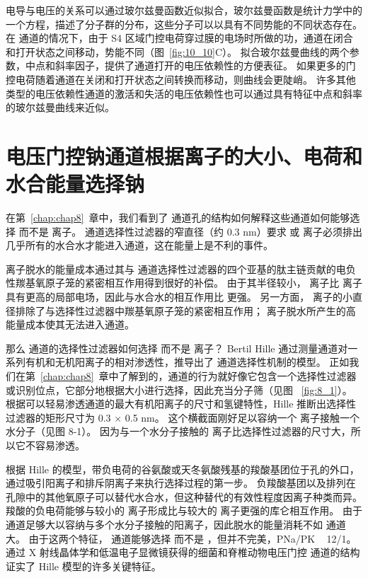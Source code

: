 电导与电压的关系可以通过玻尔兹曼函数近似拟合，玻尔兹曼函数是统计力学中的一个方程，描述了分子群的分布，这些分子可以以具有不同势能的不同状态存在。
在  通道的情况下，由于 S4 区域门控电荷穿过膜的电场时所做的功，通道在闭合和打开状态之间移动，势能不同（图~\ref{fig:10_10}C）。
拟合玻尔兹曼曲线的两个参数，中点和斜率因子，提供了通道打开的电压依赖性的方便表征。
如果更多的门控电荷随着通道在关闭和打开状态之间转换而移动，则曲线会更陡峭。
许多其他类型的电压依赖性通道的激活和失活的电压依赖性也可以通过具有特征中点和斜率的玻尔兹曼曲线来近似。


\section{电压门控钠通道根据离子的大小、电荷和水合能量选择钠}

在第~\ref{chap:chap8}~章中，我们看到了  通道孔的结构如何解释这些通道如何能够选择  而不是  离子。
 通道选择性过滤器的窄直径（约 0.3 nm）要求  或  离子必须排出几乎所有的水合水才能进入通道，这在能量上是不利的事件。


 离子脱水的能量成本通过其与  通道选择性过滤器的四个亚基的肽主链贡献的电负性羰基氧原子笼的紧密相互作用得到很好的补偿。
由于其半径较小， 离子比  离子具有更高的局部电场，因此与水合水的相互作用比  更强。
另一方面， 离子的小直径排除了与选择性过滤器中羰基氧原子笼的紧密相互作用；
 离子脱水所产生的高能量成本使其无法进入通道。


那么  通道的选择性过滤器如何选择  而不是  离子？
Bertil Hille 通过测量通道对一系列有机和无机阳离子的相对渗透性，推导出了  通道选择性机制的模型。
正如我们在第~\ref{chap:chap8}~章中了解到的，通道的行为就好像它包含一个选择性过滤器或识别位点，它部分地根据大小进行选择，因此充当分子筛（见图 ~\ref{fig:8_1}）。
根据可以轻易渗透通道的最大有机阳离子的尺寸和氢键特性，Hille 推断出选择性过滤器的矩形尺寸为 0.3 × 0.5 nm。
这个横截面刚好足以容纳一个  离子接触一个水分子（见图 8-1）。
因为与一个水分子接触的  离子比选择性过滤器的尺寸大，所以它不容易渗透。


根据 Hille 的模型，带负电荷的谷氨酸或天冬氨酸残基的羧酸基团位于孔的外口，通过吸引阳离子和排斥阴离子来执行选择过程的第一步。
负羧酸基团以及排列在孔隙中的其他氧原子可以替代水合水，但这种替代的有效性程度因离子种类而异。
羧酸的负电荷能够与较小的  离子形成比与较大的  离子更强的库仑相互作用。
由于  通道足够大以容纳与多个水分子接触的阳离子，因此脱水的能量消耗不如  通道大。
由于这两个特征， 通道能够选择  而不是 ，但并不完美，PNa/PK ~ 12/1。
通过 X 射线晶体学和低温电子显微镜获得的细菌和脊椎动物电压门控  通道的结构证实了 Hille 模型的许多关键特征。



